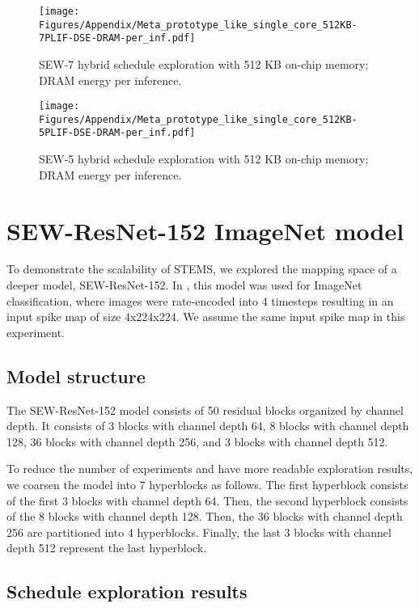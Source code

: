 \begin{figure}[t]
    \centering
    \texttt{[image: Figures/Appendix/Meta\_prototype\_like\_single\_core\_512KB-7PLIF-DSE-DRAM-per\_inf.pdf]}
    \caption{SEW-7 hybrid schedule exploration with 512 KB on-chip memory; DRAM energy per inference.}
    \label{fig:sew7-512}
\end{figure}



\begin{figure}[t]
    \centering
    \texttt{[image: Figures/Appendix/Meta\_prototype\_like\_single\_core\_512KB-5PLIF-DSE-DRAM-per\_inf.pdf]}
    \caption{SEW-5 hybrid schedule exploration with 512 KB on-chip memory; DRAM energy per inference.}
    \label{fig:sew5-512}
\end{figure}


\section{SEW-ResNet-152 ImageNet model}
\label{sec:apndx}

To demonstrate the scalability of STEMS, we explored the mapping space of a deeper model, SEW-ResNet-152. In \cite{sewresnet}, this model was used for ImageNet classification, where images were rate-encoded into 4 timesteps resulting in an input spike map of size 4x224x224. We assume the same input spike map in this experiment.

\subsection{Model structure}

The SEW-ResNet-152 model consists of 50 residual blocks organized by channel depth. It consists of 3 blocks with channel depth 64, 8 blocks with channel depth 128, 36 blocks with channel depth 256, and 3 blocks with channel depth 512. 

To reduce the number of experiments and have more readable exploration results, we coarsen the model into 7 hyperblocks as follows. The first hyperblock consists of the first 3 blocks with channel depth 64. Then, the second hyperblock consists of the 8 blocks with channel depth 128. Then, the 36 blocks with channel depth 256 are partitioned into 4 hyperblocks. Finally, the last 3 blocks with channel depth 512 represent the last hyperblock.



\subsection{Schedule exploration results}

